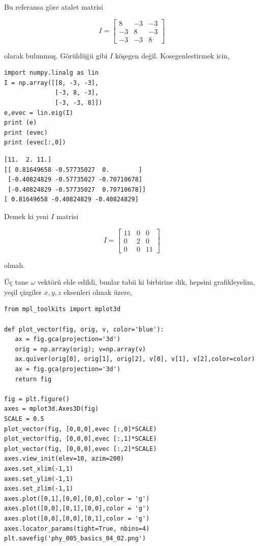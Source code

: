 \documentclass[12pt,fleqn]{article}\usepackage{../../common}
\begin{document}
Bu referansa göre atalet matrisi

$$
I = \left[\begin{array}{rrr}
8 & -3 & -3 \\
-3 & 8 & -3 \\
-3 & -3 & 8
\end{array}\right]
$$

olarak bulunmuş. Görüldüğü gibi $I$ köşegen değil. Kosegenlestirmek icin,

\begin{verbatim}
import numpy.linalg as lin
I = np.array([[8, -3, -3],
              [-3, 8, -3],
              [-3, -3, 8]])
e,evec = lin.eig(I)
print (e)
print (evec)
print (evec[:,0])
\end{verbatim}

\begin{verbatim}
[11.  2. 11.]
[[ 0.81649658 -0.57735027  0.        ]
 [-0.40824829 -0.57735027 -0.70710678]
 [-0.40824829 -0.57735027  0.70710678]]
[ 0.81649658 -0.40824829 -0.40824829]
\end{verbatim}

Demek ki yeni $I$ matrisi

$$
I = \left[\begin{array}{rrr}
11 & 0 & 0 \\
0 & 2 & 0 \\
0 & 0 & 11 
\end{array}\right]
$$

olmalı.

Üç tane $\omega$ vektörü elde edildi, bunlar tabii ki birbirine dik, hepsini
grafikleyelim, yeşil çizgiler $x,y,z$ eksenleri olmak üzere,

\begin{verbatim}
from mpl_toolkits import mplot3d

def plot_vector(fig, orig, v, color='blue'):
   ax = fig.gca(projection='3d')
   orig = np.array(orig); v=np.array(v)
   ax.quiver(orig[0], orig[1], orig[2], v[0], v[1], v[2],color=color)
   ax = fig.gca(projection='3d')  
   return fig

fig = plt.figure()
axes = mplot3d.Axes3D(fig)
SCALE = 0.5
plot_vector(fig, [0,0,0],evec [:,0]*SCALE)
plot_vector(fig, [0,0,0],evec [:,1]*SCALE)
plot_vector(fig, [0,0,0],evec [:,2]*SCALE)
axes.view_init(elev=10, azim=200)
axes.set_xlim(-1,1)
axes.set_ylim(-1,1)
axes.set_zlim(-1,1)
axes.plot([0,1],[0,0],[0,0],color = 'g')
axes.plot([0,0],[0,1],[0,0],color = 'g')
axes.plot([0,0],[0,0],[0,1],color = 'g')
axes.locator_params(tight=True, nbins=4)
plt.savefig('phy_005_basics_04_02.png')
\end{verbatim}
\end{document}
